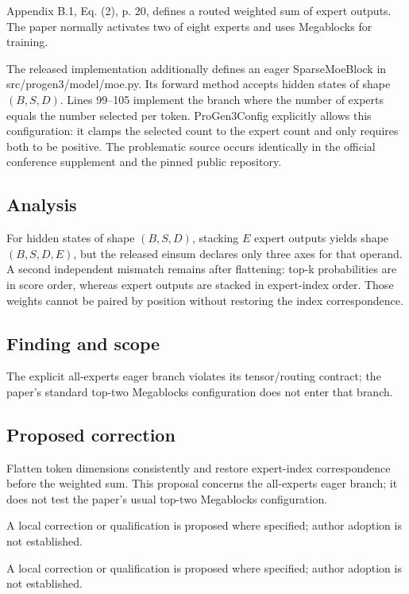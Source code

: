 \documentclass[11pt]{article}
\begin{document}
Appendix B.1, Eq. (2), p. 20, defines a routed weighted sum of expert outputs. The paper normally activates two of eight experts and uses Megablocks for training.

The released implementation additionally defines an eager SparseMoeBlock in src/progen3/model/moe.py. Its forward method accepts hidden states of shape \((B,S,D)\). Lines 99–105 implement the branch where the number of experts equals the number selected per token. ProGen3Config explicitly allows this configuration: it clamps the selected count to the expert count and only requires both to be positive. The problematic source occurs identically in the official conference supplement and the pinned public repository.

\subsection*{Analysis}

For hidden states of shape \((B,S,D)\), stacking \(E\) expert outputs yields shape \((B,S,D,E)\), but the released einsum declares only three axes for that operand. A second independent mismatch remains after flattening: top-k probabilities are in score order, whereas expert outputs are stacked in expert-index order. Those weights cannot be paired by position without restoring the index correspondence.

\subsection*{Finding and scope}

The explicit all-experts eager branch violates its tensor/routing contract; the paper’s standard top-two Megablocks configuration does not enter that branch.

\subsection*{Proposed correction}

Flatten token dimensions consistently and restore expert-index correspondence before the weighted sum. This proposal concerns the all-experts eager branch; it does not test the paper's usual top-two Megablocks configuration.

A local correction or qualification is proposed where specified; author adoption is not established.

A local correction or qualification is proposed where specified; author adoption is not established.
\end{document}
